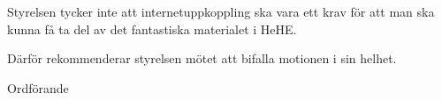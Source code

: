 \documentclass[../_main/handlingar.tex]{subfiles}
\begin{document}
\motionssvar

Styrelsen tycker inte att internetuppkoppling ska vara ett krav för att man ska kunna få ta del av det fantastiska materialet i HeHE.

Därför rekommenderar styrelsen mötet att bifalla motionen i sin helhet.


\begin{signatures}{1}
    \ist
    \signature{\ordf}{Ordförande}
\end{signatures}
\end{document}
